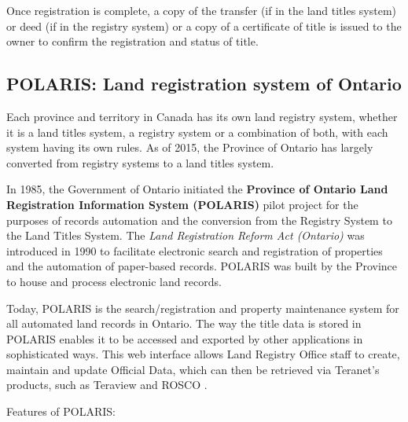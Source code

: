 Once registration is complete, a copy of the transfer (if in the land titles system) or deed (if in the registry system) or a copy of a certificate of title is issued to the owner to confirm the registration and status of title.

\subsection{POLARIS: Land registration system of Ontario} \label{subsec:lang_reg_operating_canada}

Each province and territory in Canada has its own land registry system, whether it is a land titles system, a registry system or a combination of both, with each system having its own rules.
As of 2015, the Province of Ontario has largely converted from registry systems to a land titles system.

In 1985, the Government of Ontario initiated the \textbf{Province of Ontario Land Registration Information System (POLARIS)} pilot project for the purposes of records automation and the conversion from the Registry System to the Land Titles System.
The \textit{Land Registration Reform Act (Ontario)}\cite{TheGovernmentofOntario1990} was introduced in 1990 to facilitate electronic search and registration of properties and the automation of paper-based records.
POLARIS was built by the Province to house and process electronic land records.

Today, POLARIS is the search/registration and property maintenance system for all automated land records in Ontario.
The way the title data is stored in POLARIS enables it to be accessed and exported by other applications in sophisticated ways.
This web interface allows Land Registry Office staff to create, maintain and update Official Data, which can then be retrieved via Teranet's products, such as Teraview and ROSCO .

\vspace{5mm}

Features of POLARIS\cite{TeranetEnterprisesInc.2019}:


